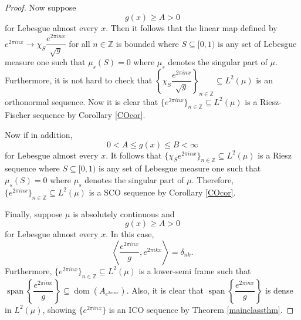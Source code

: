 \documentclass[11pt]{amsart}
\theoremstyle{definition}
\numberwithin{equation}{section}
\begin{document}
\begin{proof}
Now suppose $$g(x)\geq A>0$$ for Lebesgue almost every $x$. Then it follows that the linear map defined by $e^{2\pi i nx}\to \chi_{S}\dfrac{e^{2\pi i nx}}{\sqrt{g}}$ for all $n\in \mathbb{Z}$ is bounded where $S\subseteq [0,1)$ is any set of Lebesgue measure one such that $\mu_{s}(S)=0$ where $\mu_{s}$ denotes the singular part of $\mu$. Furthermore, it is not hard to check that $\left\{\chi_{S}\dfrac{e^{2\pi i nx}}{\sqrt{g}} \right\}_{n\in \mathbb{Z}}\subseteq L^{2}(\mu)$ is an orthonormal sequence. Now it is clear that $\{e^{2\pi i nx}\}_{n\in \mathbb{Z}}\subseteq L^2(\mu)$ is a Riesz-Fischer sequence by Corollary \ref{COcor}.

Now if in addition, $$0<A\leq g(x)\leq B<\infty$$ for Lebesgue almost every $x$. It follows that $\{\chi_{S}e^{2\pi i nx}\}_{n\in \mathbb{Z}}\subseteq L^{2}(\mu)$ is a Riesz sequence where $S\subseteq [0,1)$ is any set of Lebesgue measure one such that $\mu_{s}(S)=0$ where $\mu_{s}$ denotes the singular part of $\mu$. Therefore, $\{e^{2\pi i nx}\}_{n\in \mathbb{Z}}\subseteq L^2(\mu)$ is a SCO sequence by Corollary \ref{COcor}.

Finally, suppose $\mu$ is absolutely continuous and $$g(x)\geq A>0$$ for Lebesgue almost every $x$. In this case, 
$$\left\langle \dfrac{e^{2\pi inx}}{g},e^{2\pi i kx} \right\rangle =\delta_{nk}.$$
Furthermore, $\{e^{2\pi i nx}\}_{n\in \mathbb{Z}}\subseteq L^2(\mu)$ is a lower-semi frame such that \newline $\operatorname{span}\left\{\dfrac{e^{2\pi i nx}}{g}\right\}\subseteq \operatorname{dom}(A_{e^{2\pi i nx}})$. Also, it is clear that $\operatorname{span}\left\{\dfrac{e^{2\pi i nx}}{g}\right\}$ is dense in $L^{2}(\mu)$, showing $\{e^{2\pi inx}\}$ is an ICO sequence by Theorem \ref{mainclassthm}.
\end{proof}

    




\printbibliography 
\end{document}
